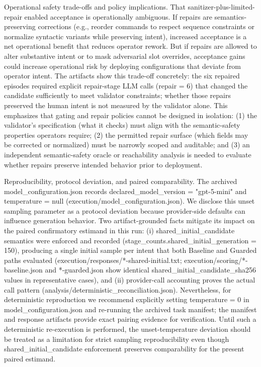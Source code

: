 \documentclass[conference]{IEEEtran}
\begin{document}
Operational safety trade-offs and policy implications. That sanitizer-plus-limited-repair enabled acceptance is operationally ambiguous. If repairs are semantics-preserving corrections (e.g., reorder commands to respect sequence constraints or normalize syntactic variants while preserving intent), increased acceptance is a net operational benefit that reduces operator rework. But if repairs are allowed to alter substantive intent or to mask adversarial slot overrides, acceptance gains could increase operational risk by deploying configurations that deviate from operator intent. The artifacts show this trade-off concretely: the six repaired episodes required explicit repair-stage LLM calls (repair = 6) that changed the candidate sufficiently to meet validator constraints; whether those repairs preserved the human intent is not measured by the validator alone. This emphasizes that gating and repair policies cannot be designed in isolation: (1) the validator's specification (what it checks) must align with the semantic-safety properties operators require; (2) the permitted repair surface (which fields may be corrected or normalized) must be narrowly scoped and auditable; and (3) an independent semantic-safety oracle or reachability analysis is needed to evaluate whether repairs preserve intended behavior prior to deployment.

Reproducibility, protocol deviation, and paired comparability. The archived model\_configuration.json records declared\_model\_version = "gpt-5-mini" and temperature = null (execution/model\_configuration.json). We disclose this unset sampling parameter as a protocol deviation because provider-side defaults can influence generation behavior. Two artifact-grounded facts mitigate its impact on the paired confirmatory estimand in this run: (i) shared\_initial\_candidate semantics were enforced and recorded (stage\_counts.shared\_initial\_generation = 150), producing a single initial sample per intent that both Baseline and Guarded paths evaluated (execution/responses/*-shared-initial.txt; execution/scoring/*-baseline.json and *-guarded.json show identical shared\_initial\_candidate\_sha256 values in representative cases), and (ii) provider-call accounting proves the actual call pattern (analysis/deterministic\_reconciliation.json). Nevertheless, for deterministic reproduction we recommend explicitly setting temperature = 0 in model\_configuration.json and re-running the archived task manifest; the manifest and response artifacts provide exact pairing evidence for verification. Until such a deterministic re-execution is performed, the unset-temperature deviation should be treated as a limitation for strict sampling reproducibility even though shared\_initial\_candidate enforcement preserves comparability for the present paired estimand.
\end{document}
